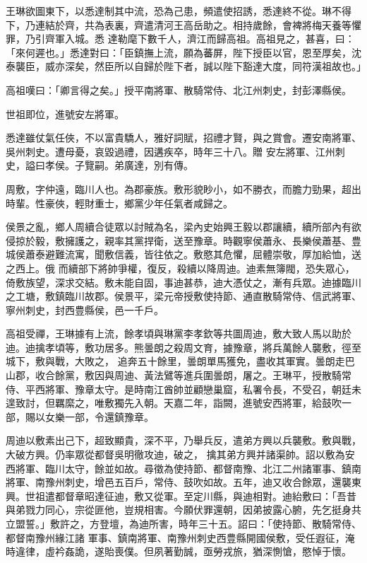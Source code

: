 \begin{pinyinscope}
 王琳欲圖東下，以悉達制其中流，恐為己患，頻遣使招誘，悉達終不從。琳不得下，乃連結於齊，共為表裏，齊遣清河王高岳助之。相持歲餘，會裨將梅天養等懼罪，乃引齊軍入城。悉
 達勒麾下數千人，濟江而歸高祖。高祖見之，甚喜，曰：「來何遲也。」悉達對曰：「臣鎮撫上流，願為蕃屏，陛下授臣以官，恩至厚矣，沈泰襲臣，威亦深矣，然臣所以自歸於陛下者，誠以陛下豁達大度，同符漢祖故也。」



 高祖嘆曰：「卿言得之矣。」授平南將軍、散騎常侍、北江州刺史，封彭澤縣侯。



 世祖即位，進號安左將軍。



 悉達雖仗氣任俠，不以富貴驕人，雅好詞賦，招禮才賢，與之賞會。遷安南將軍、吳州刺史。遭母憂，哀毀過禮，因遘疾卒，時年三十八。贈
 安左將軍、江州刺史，謚曰孝侯。子覽嗣。弟廣達，別有傳。



 周敷，字仲遠，臨川人也。為郡豪族。敷形貌眇小，如不勝衣，而膽力勁果，超出時輩。性豪俠，輕財重士，鄉黨少年任氣者咸歸之。



 侯景之亂，鄉人周續合徒眾以討賊為名，梁內史始興王毅以郡讓續，續所部內有欲侵掠於毅，敷擁護之，親率其黨捍衛，送至豫章。時觀寧侯蕭永、長樂侯蕭基、豊城侯蕭泰避難流寓，聞敷信義，皆往依之。敷愍其危懼，屈體崇敬，厚加給恤，送之西上。俄
 而續部下將帥爭權，復反，殺續以降周迪。迪素無簿閥，恐失眾心，倚敷族望，深求交結。敷未能自固，事迪甚恭，迪大憑仗之，漸有兵眾。迪據臨川之工塘，敷鎮臨川故郡。侯景平，梁元帝授敷使持節、通直散騎常侍、信武將軍、寧州刺史，封西豊縣侯，邑一千戶。



 高祖受禪，王琳據有上流，餘孝頃與琳黨李孝欽等共圖周迪，敷大致人馬以助於迪。迪擒孝頃等，敷功居多。熊曇朗之殺周文育，據豫章，將兵萬餘人襲敷，徑至城下，敷與戰，大敗之，
 追奔五十餘里，曇朗單馬獲免，盡收其軍實。曇朗走巴山郡，收合餘黨，敷因與周迪、黃法鷿等進兵圍曇朗，屠之。王琳平，授散騎常侍、平西將軍、豫章太守。是時南江酋帥並顧戀巢窟，私署令長，不受召，朝廷未遑致討，但羈縻之，唯敷獨先入朝。天嘉二年，詣闕，進號安西將軍，給鼓吹一部，賜以女樂一部，令還鎮豫章。



 周迪以敷素出己下，超致顯貴，深不平，乃舉兵反，遣弟方興以兵襲敷。敷與戰，大破方興。仍率眾從都督吳明徹攻迪，破之，
 擒其弟方興并諸渠帥。詔以敷為安西將軍、臨川太守，餘並如故。尋徵為使持節、都督南豫、北江二州諸軍事、鎮南將軍、南豫州刺史，增邑五百戶，常侍、鼓吹如故。五年，迪又收合餘眾，還襲東興。世祖遣都督章昭達征迪，敷又從軍。至定川縣，與迪相對。迪紿敷曰：「吾昔與弟戮力同心，宗從匪他，豈規相害。今願伏罪還朝，因弟披露心腑，先乞挺身共立盟誓。」敷許之，方登壇，為迪所害，時年三十五。詔曰：「使持節、散騎常侍、都督南豫州緣江諸
 軍事、鎮南將軍、南豫州刺史西豊縣開國侯敷，受任遐征，淹時違律，虛衿姦詭，遂貽喪僕。但夙著勤誠，亟勞戎旅，猶深惻愴，愍悼于懷。




\end{pinyinscope}
